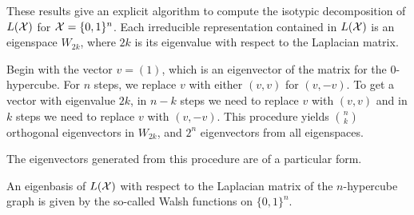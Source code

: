 \documentclass[cclicense]{hmcthesis}
\numberwithin{equation}{chapter}
\numberwithin{ucounter}{chapter}
\begin{document}
    These results give an explicit algorithm to compute the isotypic
    decomposition of $L(\mathcal{X})$ for $\mathcal{X} = \{0, 1\}^n$.  Each irreducible
    representation contained in $L(\mathcal{X})$ is an eigenspace $W_{2k}$, where $2k$ is
    its eigenvalue with respect to the Laplacian matrix.  
    
    Begin with the vector $v = (1)$, which is an eigenvector of the matrix for
    the $0$-hypercube.  For $n$ steps, we replace $v$ with either $(v, v)$ for
    $(v, -v)$.  To get a vector with eigenvalue $2k$, in $n-k$ steps we need to
    replace $v$ with $(v, v)$ and in $k$ steps we need to replace $v$ with $(v,
    -v)$.  This procedure yields $n \choose k$ orthogonal eigenvectors in
    $W_{2k}$, and $2^n$ eigenvectors from all eigenspaces.

    The eigenvectors generated from this procedure are of a particular form.

    \begin{corollary}
        An eigenbasis of $L(\mathcal{X})$ with respect to the Laplacian matrix of the
        $n$-hypercube graph is given by the so-called Walsh functions on $\{0,
        1\}^n$.
        \label{cor:walsh}
    \end{corollary}
\end{document}
